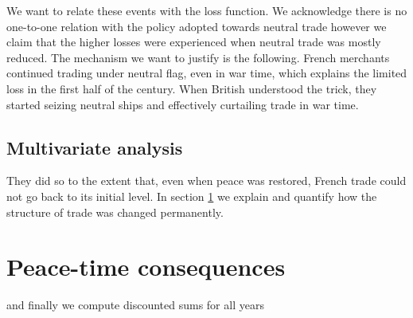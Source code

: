 \documentclass[12pt,a4paper,notitlepage,english]{article}
\begin{document}
We want to relate these events with the loss function. We acknowledge there is no one-to-one relation with the policy adopted towards neutral trade however we claim that the higher losses were experienced when neutral trade was mostly reduced. The mechanism we want to justify is the following. French merchants continued trading under neutral flag, even in war time, which explains the limited loss in the first half of the century. When British understood the trick, they started seizing neutral ships and effectively curtailing trade in war time.




 \subsection{Multivariate analysis}
 
 
 

They did so to the extent that, even when peace was restored, French trade could not go back to its initial level. In section \ref{sec:empirical_analysis} we explain and quantify how the structure of trade was changed permanently.  






\section{Peace-time consequences} \label{sec:empirical_analysis}


and finally we compute discounted sums for all years
\end{document}
